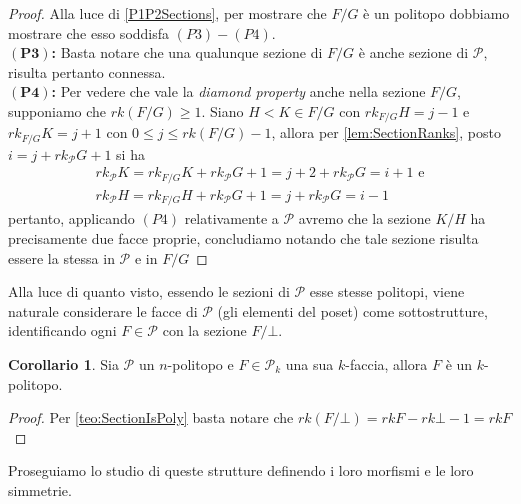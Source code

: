 \documentclass[a4paper,12pt]{report}
\newcommand{\p}{\mathcal{P}}
\theoremstyle{plain}
\theoremstyle{definition}
\newtheorem{corol}[teo]{Corollario}
\begin{document}
\begin{proof}
Alla luce di \ref{P1P2Sections}, per mostrare che $F/G$ \`e un politopo dobbiamo mostrare che esso soddisfa $(P3)-(P4)$.\\
$\bm{(P3)}$\textbf{:} Basta notare che una qualunque sezione di $F/G$ \`e anche sezione di $\p$, risulta pertanto connessa.\\
$\bm{(P4)}$\textbf{:} Per vedere che vale la \emph{diamond property} anche nella sezione $F/G$, supponiamo che $rk(F/G)\geq1$.
Siano $H<K\in F/G$ con $rk_{F/G}H=j-1$ e $rk_{F/G}K=j+1$ con $0\leq j\leq rk(F/G)-1$, allora per \ref{lem:SectionRanks}, posto
$i=j+rk_\p G+1$ si ha
\begin{gather*}
rk_\p K=rk_{F/G}K+rk_\p G+1=j+2+rk_\p G=i+1\text{ e}\\
rk_\p H=rk_{F/G}H+rk_\p G+1=j+rk_\p G=i-1
\end{gather*}
pertanto, applicando $(P4)$ relativamente a $\p$ avremo che la sezione $K/H$ ha precisamente due facce proprie, concludiamo notando che tale
sezione risulta essere la stessa in $\p$ e in $F/G$
\end{proof}
Alla luce di quanto visto, essendo le sezioni di $\p$ esse stesse politopi, viene naturale considerare le facce di $\p$ (gli elementi del poset)
come sottostrutture, identificando ogni $F\in\p$ con la sezione $F/\bot$.
\begin{corol}
Sia $\p$ un $n$-politopo e $F\in\p_k$ una sua $k$-faccia, allora $F$ \`e un $k$-politopo.
\end{corol}
\begin{proof}
Per \ref{teo:SectionIsPoly} basta notare che $rk(F/\bot)=rkF-rk\bot-1=rkF$
\end{proof}

Proseguiamo lo studio di queste strutture definendo i loro morfismi e le loro simmetrie.
\end{document}
